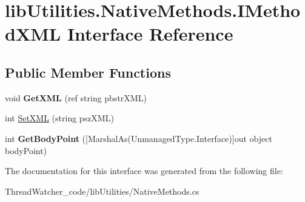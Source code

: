 \hypertarget{interfacelib_utilities_1_1_native_methods_1_1_i_method_x_m_l}{\section{lib\+Utilities.\+Native\+Methods.\+I\+Method\+X\+M\+L Interface Reference}
\label{interfacelib_utilities_1_1_native_methods_1_1_i_method_x_m_l}
}
\subsection*{Public Member Functions}
\begin{DoxyCompactItemize}
\item 
\hypertarget{interfacelib_utilities_1_1_native_methods_1_1_i_method_x_m_l_aaba4d25d0650a6257e77c6d23352b2da}{void {\bfseries Get\+X\+M\+L} (ref string pbstr\+X\+M\+L)}\label{interfacelib_utilities_1_1_native_methods_1_1_i_method_x_m_l_aaba4d25d0650a6257e77c6d23352b2da}

\item 
\hypertarget{interfacelib_utilities_1_1_native_methods_1_1_i_method_x_m_l_a92558ee8b42d1db4e33e1c5086555ae8}{int \hyperlink{interfacelib_utilities_1_1_native_methods_1_1_i_method_x_m_l_a92558ee8b42d1db4e33e1c5086555ae8}{Set\+X\+M\+L} (string psz\+X\+M\+L)}\label{interfacelib_utilities_1_1_native_methods_1_1_i_method_x_m_l_a92558ee8b42d1db4e33e1c5086555ae8}

\item 
\hypertarget{interfacelib_utilities_1_1_native_methods_1_1_i_method_x_m_l_aa7666482cb4236b452558a82ae33c063}{int {\bfseries Get\+Body\+Point} (\mbox{[}Marshal\+As(Unmanaged\+Type.\+Interface)\mbox{]}out object body\+Point)}\label{interfacelib_utilities_1_1_native_methods_1_1_i_method_x_m_l_aa7666482cb4236b452558a82ae33c063}

\end{DoxyCompactItemize}


The documentation for this interface was generated from the following file\+:\begin{DoxyCompactItemize}
\item 
Thread\+Watcher\+\_\+code/lib\+Utilities/Native\+Methods.\+cs\end{DoxyCompactItemize}
